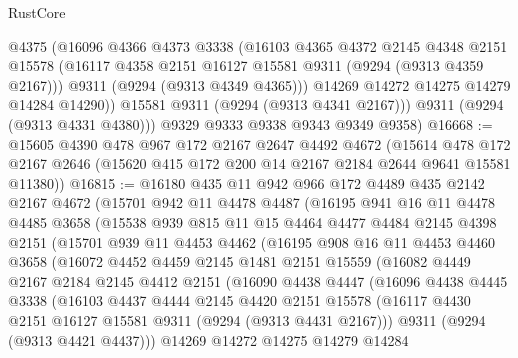 \begin{lexlean}{RustCore}
\begin{coremodule}
            @4375
            (@16096
              @4366
              @4373
              @3338
              (@16103
                @4365
                @4372
                @2145
                @4348
                @2151
                @15578
                (@16117 @4358 @2151 @16127 @15581 @9311 (@9294 (@9313 @4359 @2167)))
                @9311
                (@9294 (@9313 @4349 @4365)))
              @14269
              @14272
              @14275
              @14279
              @14284
              @14290))
          @15581
          @9311
          (@9294 (@9313 @4341 @2167)))
        @9311
        (@9294 (@9313 @4331 @4380)))
      @9329
      @9333
      @9338
      @9343
      @9349
      @9358)
@16668 := @15605
    @4390
    @478
    @967
    @172
    @2167
    @2647
    @4492
    @4672
    (@15614 @478 @172 @2167 @2646 (@15620 @415 @172 @200 @14 @2167 @2184 @2644 @9641 @15581 @11380))
@16815 := @16180
    @435
    @11
    @942
    @966
    @172
    @4489
    @435
    @2142
    @2167
    @4672
    (@15701
      @942
      @11
      @4478
      @4487
      (@16195
        @941
        @16
        @11
        @4478
        @4485
        @3658
        (@15538
          @939
          @815
          @11
          @15
          @4464
          @4477
          @4484
          @2145
          @4398
          @2151
          (@15701
            @939
            @11
            @4453
            @4462
            (@16195
              @908
              @16
              @11
              @4453
              @4460
              @3658
              (@16072
                @4452
                @4459
                @2145
                @1481
                @2151
                @15559
                (@16082
                  @4449
                  @2167
                  @2184
                  @2145
                  @4412
                  @2151
                  (@16090
                    @4438
                    @4447
                    (@16096
                      @4438
                      @4445
                      @3338
                      (@16103
                        @4437
                        @4444
                        @2145
                        @4420
                        @2151
                        @15578
                        (@16117 @4430 @2151 @16127 @15581 @9311 (@9294 (@9313 @4431 @2167)))
                        @9311
                        (@9294 (@9313 @4421 @4437)))
                      @14269
                      @14272
                      @14275
                      @14279
                      @14284

\end{coremodule}
\end{lexlean}
